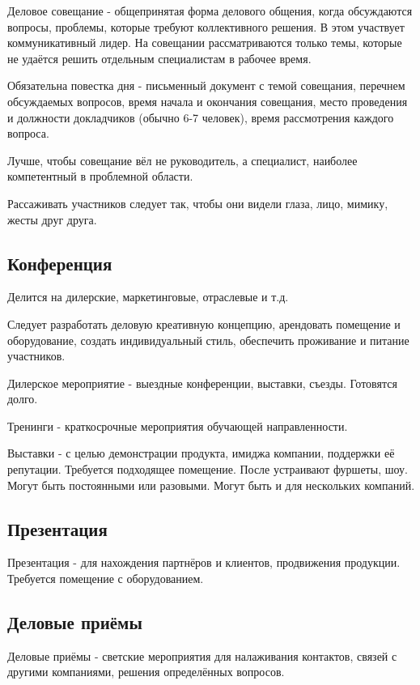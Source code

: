 \documentclass[a4paper,14pt]{extarticle}
\begin{document}
Деловое совещание - общепринятая форма делового общения, когда обсуждаются вопросы, проблемы, которые требуют коллективного решения. В этом участвует коммуникативный лидер. На совещании рассматриваются только темы, которые не удаётся решить отдельным специалистам в рабочее время.

Обязательна повестка дня - письменный документ с темой совещания, перечнем обсуждаемых вопросов, время начала и окончания совещания, место проведения и должности докладчиков (обычно 6-7 человек), время рассмотрения каждого вопроса.

Лучше, чтобы совещание вёл не руководитель, а специалист, наиболее компетентный в проблемной области.

Рассаживать участников следует так, чтобы они видели глаза, лицо, мимику, жесты друг друга.

\subsection{Конференция}

Делится на дилерские, маркетинговые, отраслевые и т.д.

Следует разработать деловую креативную концепцию, арендовать помещение и оборудование, создать индивидуальный стиль, обеспечить проживание и питание участников.

Дилерское мероприятие - выездные конференции, выставки, съезды. Готовятся долго.

Тренинги - краткосрочные мероприятия обучающей направленности.

Выставки - с целью демонстрации продукта, имиджа компании, поддержки её репутации. Требуется подходящее помещение. После устраивают фуршеты, шоу. Могут быть постоянными или разовыми. Могут быть и для нескольких компаний.

\subsection{Презентация}

Презентация - для нахождения партнёров и клиентов, продвижения продукции. Требуется помещение с оборудованием.

\subsection{Деловые приёмы}

Деловые приёмы - светские мероприятия для налаживания контактов, связей с другими компаниями, решения определённых вопросов.
\end{document}
